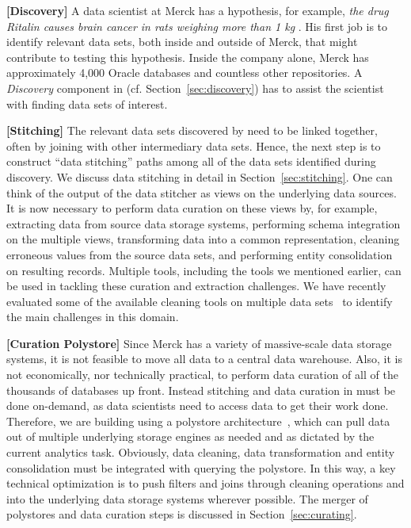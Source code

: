 {\bf[Discovery]} A data scientist at Merck has a hypothesis, for example, {\it the drug Ritalin causes brain cancer in rats weighing more than 1 kg }.  His first job is to identify relevant data sets, both inside and outside of Merck, that might contribute to testing this hypothesis.  Inside the company alone, Merck has approximately  4,000 Oracle databases and countless other repositories.  A {\it Discovery} component in \dcv (cf. Section~\ref{sec:discovery}) has to assist the scientist with finding data sets of interest.

{\bf[Stitching]} The relevant data sets discovered by \dcv  need to be  linked together, often by joining with other intermediary data sets.  Hence, the next step is to construct ``data stitching'' paths among all of the data sets identified during discovery.  We discuss data stitching in detail 
in Section~\ref{sec:stitching}. One can think of the output of the data stitcher as views on the underlying data sources. It is now necessary to perform data curation on these views by, for example, extracting data from source data storage systems, performing schema integration on the multiple views, transforming data into a common representation, cleaning erroneous values from the source data sets, and performing entity consolidation on resulting records. Multiple tools, including the tools we mentioned earlier, can be used in tackling these curation and extraction challenges. We have recently evaluated some of the available cleaning tools on multiple data sets~\cite{evaluatioin} to identify the main challenges in this domain.

{\bf[Curation Polystore]} Since Merck has a variety of massive-scale data storage systems, it is  not feasible to move all data to a  central data warehouse. Also, it is not economically, nor technically practical, to perform data curation of all of the thousands of databases up front.
 Instead stitching and data curation in \dcv must be done on-demand, as data scientists need to access data to get
their work done.  Therefore, we are building \dcv using a polystore architecture~\cite{DBLP:journals/sigmod/DugganESBHKMMMZ15}, which  can pull data out of multiple underlying storage engines as needed and as dictated by the current analytics task.  Obviously, data cleaning, data transformation and entity consolidation must be integrated with querying the polystore.  In this way, a key technical optimization is to push filters and joins through cleaning operations and into the underlying data storage systems wherever possible.  The
merger of polystores and data curation steps is discussed in Section~\ref{sec:curating}.

